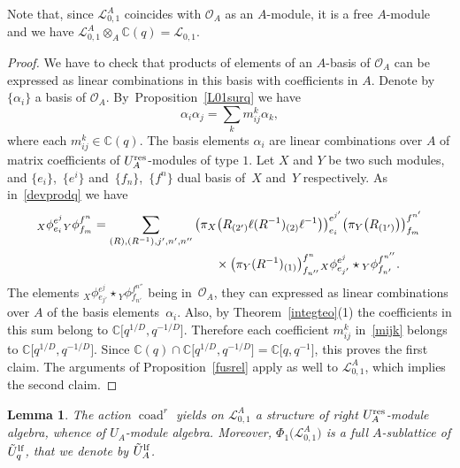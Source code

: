 \documentclass[pdftex]{sigma}%
\numberwithin{equation}{section}
\numberwithin{figure}{section}
\newtheorem{lem}[teo]{Lemma}
\newcommand{\mc}{\mathbb{C}}
\newcommand{\Ll}{{\mathcal L}}
\newcommand{\Oo}{{\mathcal O}}
\begin{document}
Note that, since $\Ll_{0,1}^A$ coincides with $\Oo_A$ as an $A$-module, it is a free $A
$-module and we have $\Ll_{0,1}^A\otimes_A {\mathbb C}(q)=\Ll_{0,1}$.
\begin{proof} We have to check that products of elements of an $A$-basis of ${\mathcal O}_A$ can be expressed as linear combinations in this basis with coefficients in $A$. Denote by $\{\alpha_i\}$ a basis of $\Oo_A$. By~Pro\-po\-sition~\ref{L01surq} we have
\begin{equation}\label{mijk}
\alpha_i\alpha_j=\sum_k m^{k}_{ij}\alpha_k,
\end{equation}
where each $m^{k}_{ij}\in \mc(q)$. The basis elements $\alpha_i$ are linear combinations over $A$ of matrix coef\-fi\-cients of $U_A^{\rm res}$-modules of type $1$. Let $X$ and $Y$ be two such modules, and $\{e_i\}$,~$\{e^i\}$ and~$\{f_n\}$,~$\{f^n\}$ dual basis of~$X$ and~$Y$ respectively. As in~\eqref{devprodq} we have
\begin{gather*}
{}_{X}\phi{}^{e^j}_{e_i}{}_{Y}\phi{}^{f^n}_{f_m}= \sum_{(R),(R^{-1}), j', n',n'' }\big(\pi_{X}\big(R_{(2')}\ell (R^{-1})_{(2)}\ell^{-1}\big)\big)^{e^{j'}}_{e_i}
 \big(\pi_{Y}\big(R_{(1')}\big)\big)^{f^{n'}}_{f_{m}} \\
 \hphantom{{}_{X}\phi{}^{e^j}_{e_i}{}_{Y}\phi{}^{f^n}_{f_m}= \sum_{(R),(R^{-1}), j', n',n'' }}{}\times
 \big(\pi_{Y}(R^{-1})_{(1)}\big)^{f^{n}}_{f_{n''}}
{}_{X}\phi{}^{e^j}_{e_{j'}} \star {}_{Y}\phi{}^{f^{n''}}_{f_{n'}}.
\end{gather*}
The elements ${}_{X}\phi{}^{e^j}_{e_{j'}} \star {}_{Y}\phi{}^{f^{n''}}_{f_{n'}}$ being in~$\Oo_A$, they can expressed as linear combinations over $A$ of the basis elements~$\alpha_i$. Also, by Theorem~\ref{integteo}(1) the coefficients in this sum belong to $\mc\big[q^{1/D},q^{-1/D}\big]$. Therefore each coefficient $m^{k}_{ij}$ in~\eqref{mijk} belongs to $\mc\big[q^{1/D},q^{-1/D}\big]$. Since $\mc(q) \cap \mc\big[q^{1/D},q^{-1/D}\big] = \mc\big[q,q^{-1}\big]$, this proves the first claim. The arguments of Proposition~\ref{fusrel} apply as well to $\Ll_{0,1}^A$, which implies the second claim.\end{proof}

\begin{lem} \label{intform} The action $\operatorname{coad}^r$ yields on $\Ll_{0,1}^A$ a structure of right $U_A^{\rm res}$-module algebra, whence of $U_A$-module algebra. Moreover, $\Phi_1\big(\Ll_{0,1}^A\big)$ is a full $A$-sublattice of $\tilde U_q^{\rm lf}$, that we denote by $\tilde{U}_A^{\rm lf}$.
\end{lem}
\end{document}
